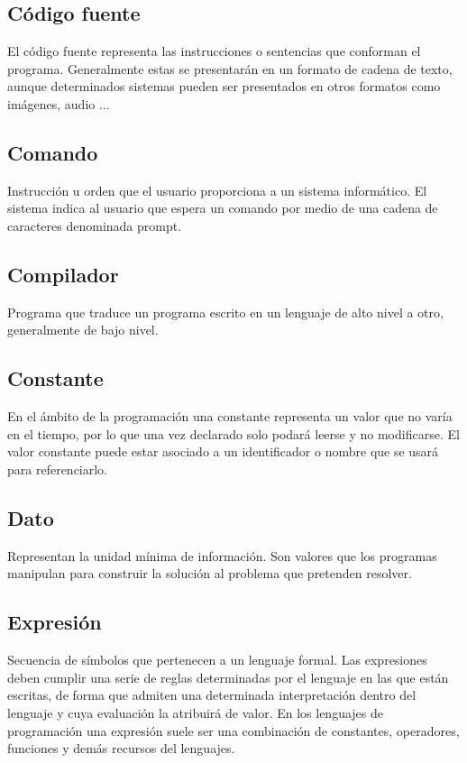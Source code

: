 \subsection {Código fuente}
El código fuente representa las instrucciones o sentencias que conforman el programa. Generalmente estas se presentarán en un formato de cadena de texto, aunque determinados sistemas
pueden ser presentados en otros formatos como imágenes, audio ...

\subsection {Comando}
Instrucción u orden que el usuario proporciona a un sistema informático. El sistema indica al usuario que espera un comando por medio de una cadena de caracteres denominada prompt. 

\subsection{Compilador}
Programa que traduce un programa escrito en un lenguaje de alto nivel a otro, generalmente de bajo nivel.  

\subsection {Constante}
En el ámbito de la programación una constante representa un valor que no varía en el tiempo, por lo que una vez declarado solo podará leerse y no modificarse. El valor constante 
puede estar asociado a un identificador o nombre que se usará para referenciarlo. 

\subsection{Dato}
Representan la unidad mínima de información. Son valores que los programas manipulan para construir la solución al problema que pretenden resolver.

\subsection{Expresión}
Secuencia de símbolos que pertenecen a un lenguaje formal. Las expresiones deben cumplir una serie de reglas determinadas por el lenguaje 
en las que están escritas, de forma que admiten una determinada interpretación dentro del lenguaje y cuya evaluación la atribuirá de valor. 
En los lenguajes de programación una expresión suele ser una combinación de constantes, operadores, funciones y demás recursos del lenguajes. 

